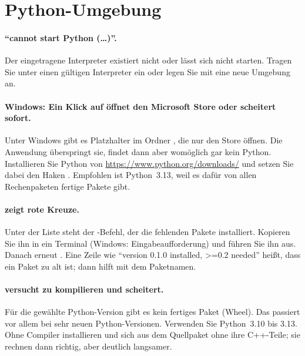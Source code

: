 \section{Python-Umgebung}

\paragraph{\enquote{cannot start Python (\dots)}.}
Der eingetragene Interpreter existiert nicht oder lässt sich nicht starten. Tragen Sie unter
 einen gültigen Interpreter ein oder legen Sie mit
 eine neue Umgebung an.

\paragraph{Windows: Ein Klick auf  öffnet den Microsoft Store
oder scheitert sofort.}
Unter Windows gibt es Platzhalter  im Ordner , die nur
den Store öffnen. Die Anwendung überspringt sie, findet dann aber womöglich gar kein Python.
Installieren Sie Python von \url{https://www.python.org/downloads/} und setzen Sie dabei den
Haken . Empfohlen ist Python~3.13, weil es dafür von allen
Rechenpaketen fertige Pakete gibt.

\paragraph{ zeigt rote Kreuze.}
Unter der Liste steht der -Befehl, der die fehlenden Pakete installiert. Kopieren Sie
ihn in ein Terminal (Windows: Eingabeaufforderung) und führen Sie ihn aus. Danach erneut
. Eine Zeile wie \enquote{version 0.1.0 installed, >=0.2 needed} heißt,
dass ein Paket zu alt ist; dann hilft  mit dem Paketnamen.

\paragraph{ versucht zu kompilieren und scheitert.}
Für die gewählte Python-Version gibt es kein fertiges Paket (Wheel). Das passiert vor allem bei
sehr neuen Python-Versionen. Verwenden Sie Python~3.10 bis 3.13. Ohne Compiler installieren
 und  sich aus dem Quellpaket ohne ihre
C++-Teile; sie rechnen dann richtig, aber deutlich langsamer.

